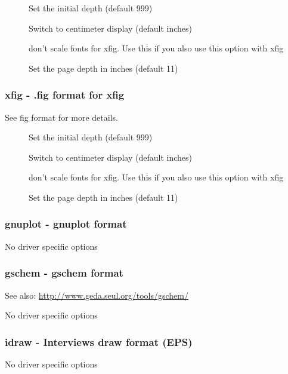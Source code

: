 \documentclass[english,a4paper]{article}
\let\URL\url \let\Email\url \let\File\url
\begin{document}
\begin{description}
\item[] 
Set the initial depth (default 999)


\item[] 
Switch to centimeter display (default inches)


\item[] 
don't scale fonts for xfig. Use this if you also use this option with xfig


\item[] 
Set the page depth in inches (default 11)


\end{description}
\subsubsection{xfig - .fig format for xfig}
See fig format for more details.

\begin{description}
\item[] 
Set the initial depth (default 999)


\item[] 
Switch to centimeter display (default inches)


\item[] 
don't scale fonts for xfig. Use this if you also use this option with xfig


\item[] 
Set the page depth in inches (default 11)


\end{description}
\subsubsection{gnuplot - gnuplot format}
No driver specific options
\subsubsection{gschem - gschem format}
See also:  \URL{http://www.geda.seul.org/tools/gschem/} 

No driver specific options
\subsubsection{idraw - Interviews draw format (EPS)}
No driver specific options
\end{document}
